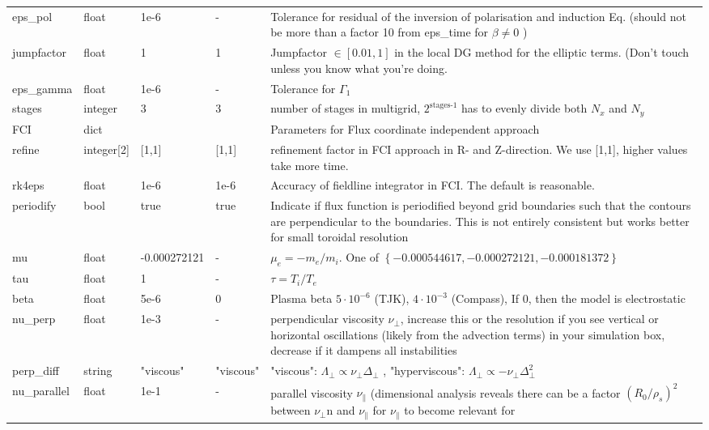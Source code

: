 \begin{longtable}{llllp{6cm}}
\\
eps\_pol    & float & 1e-6  & - &  Tolerance for residual of the inversion of polarisation and induction Eq. (should not be more than a factor 10 from eps\_time for $\beta\neq  0$ )
\\
jumpfactor  & float & 1 & 1 & Jumpfactor $\in \left[0.01,1\right]$ in the local DG method for the elliptic terms. (Don't touch unless you know what you're doing.
\\
eps\_gamma  & float & 1e-6  & - & Tolerance for $\Gamma_1$
\\
stages      & integer & 3 & 3 & number of stages in multigrid, $2^{\text{stages-1}}$
has to evenly divide both $N_x$ and $N_y$
\\
FCI & dict & & & Parameters for Flux coordinate independent approach
\\
\qquad refine     & integer[2] & [1,1] & [1,1] & refinement factor in FCI approach in R- and Z-direction.
We use [1,1], higher values take more time.
\\
\qquad rk4eps     & float & 1e-6 & 1e-6 & Accuracy of fieldline integrator in FCI. The default is reasonable.
\\
\qquad periodify & bool & true & true & Indicate if flux function is periodified beyond grid boundaries such that the contours are perpendicular to the boundaries. This is not entirely consistent but works better for small toroidal resolution
\\
mu         & float & -0.000272121& - & $\mu_e =-m_e/m_i$.
    One of $\left\{ -0.000544617, -0.000272121, -0.000181372 \right\}$
\\
tau        & float &1      & - & $\tau = T_i/T_e$
\\
beta       & float & 5e-6  & 0 & Plasma beta $5\cdot 10^{-6}$ (TJK), $4\cdot
10^{-3}$ (Compass), If $0$, then the model is electrostatic
\\
nu\_perp   & float &1e-3   & - & perpendicular viscosity $\nu_\perp$, increase
this or the resolution if you see vertical or horizontal oscillations (likely
from the advection terms) in your simulation box, decrease if it dampens all
instabilities
\\
perp\_diff & string & "viscous" & "viscous" & "viscous": $\Lambda_\perp\propto
\nu_\perp\Delta_\perp$ , "hyperviscous": $\Lambda_\perp \propto
-\nu_\perp\Delta_\perp^2$
\\
nu\_parallel & float &1e-1 & - & parallel viscosity $\nu_\parallel$
(dimensional analysis reveals there can be a factor $(R_0/\rho_s)^2$ between
$\nu_\perp $n and $\nu_\parallel$ for $\nu_\parallel$ to become relevant for

\end{longtable}
